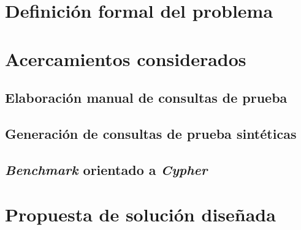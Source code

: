 \section{Definición formal del problema} \label{problem_formal_definition}

\section{Acercamientos considerados} \label{unused_approaches}

\subsection{Elaboración manual de consultas de prueba} \label{handmade_eval}

\subsection{Generación de consultas de prueba sintéticas} \label{synthetic_eval}

\subsection{\textit{Benchmark} orientado a \textit{Cypher}} \label{bench_eval}

\section{Propuesta de solución diseñada} \label{designed_proposal}

